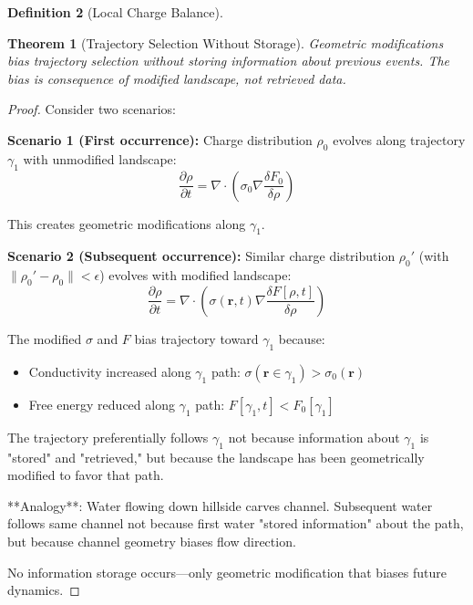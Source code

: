 \documentclass[12pt,a4paper]{article}
\theoremstyle{plain}
\newtheorem{theorem}{Theorem}[section]
\theoremstyle{definition}
\newtheorem{definition}[theorem]{Definition}
\theoremstyle{remark}
\begin{document}
\begin{definition}[Local Charge Balance]
\begin{theorem}[Trajectory Selection Without Storage]
\label{thm:trajectory_no_storage}
Geometric modifications bias trajectory selection without storing information about previous events. The bias is consequence of modified landscape, not retrieved data.
\end{theorem}

\begin{proof}
Consider two scenarios:

\textbf{Scenario 1 (First occurrence):} Charge distribution $\rho_0$ evolves along trajectory $\gamma_1$ with unmodified landscape:
\begin{equation}
\frac{\partial \rho}{\partial t} = \nabla \cdot \left( \sigma_0 \nabla \frac{\delta F_0}{\delta \rho} \right)
\end{equation}

This creates geometric modifications along $\gamma_1$.

\textbf{Scenario 2 (Subsequent occurrence):} Similar charge distribution $\rho_0'$ (with $\|\rho_0' - \rho_0\| < \epsilon$) evolves with modified landscape:
\begin{equation}
\frac{\partial \rho}{\partial t} = \nabla \cdot \left( \sigma(\mathbf{r},t) \nabla \frac{\delta F[\rho,t]}{\delta \rho} \right)
\end{equation}

The modified $\sigma$ and $F$ bias trajectory toward $\gamma_1$ because:
\begin{itemize}
\item Conductivity increased along $\gamma_1$ path: $\sigma(\mathbf{r} \in \gamma_1) > \sigma_0(\mathbf{r})$
\item Free energy reduced along $\gamma_1$ path: $F[\gamma_1,t] < F_0[\gamma_1]$
\end{itemize}

The trajectory preferentially follows $\gamma_1$ not because information about $\gamma_1$ is "stored" and "retrieved," but because the landscape has been geometrically modified to favor that path.

**Analogy**: Water flowing down hillside carves channel. Subsequent water follows same channel not because first water "stored information" about the path, but because channel geometry biases flow direction.

No information storage occurs—only geometric modification that biases future dynamics.
\end{proof}


\end{definition}
\end{document}
